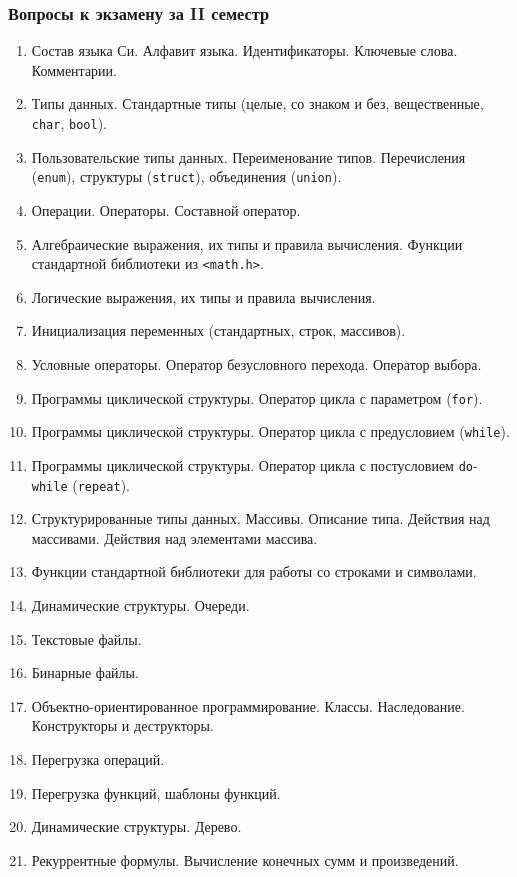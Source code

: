 \documentclass[a4paper,12pt]{article}
\begin{document}
\subsubsection*{Вопросы к экзамену за II семестр}
\begin{enumerate}
\item
Состав языка Си. Алфавит языка. Идентификаторы. Ключевые слова. Комментарии.
\item
Типы данных. Стандартные типы (целые, со знаком и без, вещественные, \texttt{char}, \texttt{bool}).
\item
Пользовательские типы данных. Переименование типов. Перечисления (\texttt{enum}), структуры (\texttt{struct}), объединения (\texttt{union}).
\item
Операции. Операторы. Составной оператор.
\item
Алгебраические выражения, их типы и правила вычисления. Функции стандартной библиотеки из \texttt{<math.h>}.
\item
Логические выражения, их типы и правила вычисления.
\item
Инициализация переменных (стандартных, строк, массивов).
\item
Условные операторы. Оператор безусловного перехода. Оператор выбора.
\item
Программы циклической структуры. Оператор цикла с параметром (\texttt{for}).
\item
Программы циклической структуры. Оператор цикла с предусловием (\texttt{while}).
\item
Программы циклической структуры. Оператор цикла с постусловием \texttt{do}-\texttt{while} (\texttt{repeat}).
\item
Структурированные типы данных. Массивы. Описание типа. Действия над массивами. Действия над элементами массива.
\item
Функции стандартной библиотеки для работы со строками и символами.
\item
Динамические структуры. Очереди.
\item
Текстовые файлы.
\item
Бинарные файлы.
\item
Объектно-ориентированное программирование. Классы. Наследование. Конструкторы и деструкторы.
\item
Перегрузка операций.
\item
Перегрузка функций, шаблоны функций.
\item
Динамические структуры. Дерево.
\item
Рекуррентные формулы. Вычисление конечных сумм и произведений.

\end{enumerate}
\end{document}
